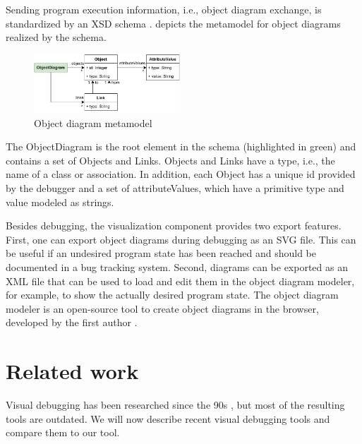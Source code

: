 \documentclass[conference]{IEEEtran}
\begin{document}
Sending program execution information, i.e., object diagram exchange, is standardized by an XSD schema \cite{ArtifactsICSME2022}.
 depicts the metamodel for object diagrams realized by the schema.

\begin{figure}[h]
    \centering
    \includegraphics[width=0.488\textwidth]{images/VD-metamodel.pdf}
    \caption{Object diagram metamodel}
    \label{fig:odMetamodel}
\end{figure}

The \textsf{ObjectDiagram} is the root element in the schema (highlighted in green) and contains a set of \textsf{Objects} and \textsf{Links}.
\textsf{Objects} and \textsf{Links} have a \textsf{type}, i.e., the name of a class or association.
In addition, each \textsf{Object} has a unique \textsf{id} provided by the debugger and a set of \textsf{attributeValues}, which have a primitive \textsf{type} and \textsf{value} modeled as strings.

Besides debugging, the visualization component provides two export features.
First, one can export object diagrams during debugging as an SVG file.
This can be useful if an undesired program state has been reached and should be documented in a bug tracking system.
Second, diagrams can be exported as an XML file that can be used to load and edit them in the object diagram modeler, for example, to show the actually desired program state.
The object diagram modeler is an open-source tool to create object diagrams in the browser, developed by the first author \cite{ObjectDiagramModeler2022}.

\section{Related work} \label{sec:relatedWork}
Visual debugging has been researched since the 90s \cite{baeza-yatesVisualDebuggingAutomatic1996, jerdingUsingVisualizationFoster1994, mukherjeaVisualDebuggingIntegrating1994, hansonSimpleExtensibleGraphical1997}, but most of the resulting tools are outdated.
We will now describe recent visual debugging tools and compare them to our tool.
\end{document}
